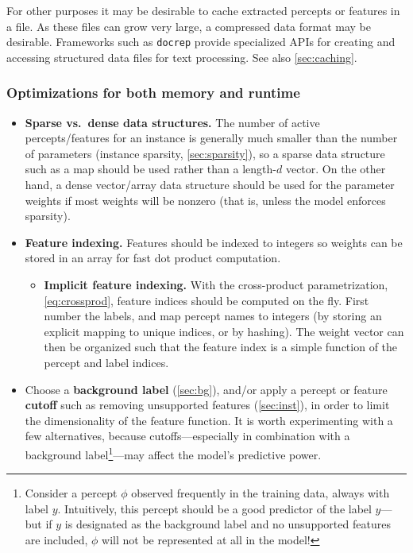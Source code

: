 \documentclass[11pt,letterpaper]{article}
\begin{document}
For other purposes it may be desirable to cache extracted percepts or features in a file. 
As these files can grow very large, a compressed data format may be desirable. 
Frameworks such as \texttt{docrep} \citep[\url{https://github.com/schwa-lab/libschwa}]{dawborn-14}
provide specialized APIs for creating and accessing structured data files for text processing. 
See also \cref{sec:caching}.

\subsubsection{Optimizations for both memory and runtime}\label{sec:memrun}

\begin{itemize}
\item \textbf{Sparse vs.~dense data structures.} 
The number of active percepts\slash features for an instance 
is generally much smaller than the number of parameters (instance sparsity, \cref{sec:sparsity}), 
so a sparse data structure such as a map should be used rather than a length-$d$ vector.
On the other hand, a dense vector/array data structure should be used for the parameter weights
if most weights will be nonzero (that is, unless the model enforces sparsity).

\item \textbf{Feature indexing.}
Features should be indexed to integers so weights can be stored in an array for fast dot product computation.
\begin{itemize}
\item \textbf{Implicit feature indexing.} 
With the cross-product parametrization, \cref{eq:crossprod}, 
feature indices should be computed on the fly.
First number the labels, 
and map percept names to integers (by storing an explicit mapping to unique indices, or by hashing).
The weight vector can then be organized such that the feature index 
is a simple function of the percept and label indices.
\end{itemize}

\item Choose a \textbf{background label} (\cref{sec:bg}), 
and\slash or apply a percept or feature \textbf{cutoff} 
such as removing unsupported features (\cref{sec:inst}), 
in order to limit the dimensionality of the feature function.
It is worth experimenting with a few alternatives, because cutoffs---especially 
in combination with a background label\footnote{Consider a percept $\phi$ observed frequently in the training
data, always with label $y$. Intuitively, this percept should be a good predictor of the label $y$---but
if $y$ is designated as the background label and no unsupported features are included,
$\phi$ will not be represented at all in the model!}---may affect the model's predictive power.
\end{itemize}
\end{document}
